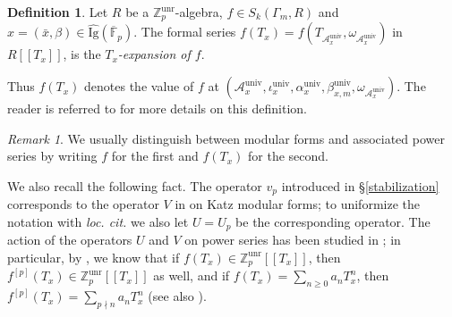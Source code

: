 \documentclass[a4paper,11pt]{amsart}
\numberwithin{equation}{section}
\theoremstyle{plain}
\theoremstyle{definition}
\newtheorem{definition}[theorem]{Definition}
\theoremstyle{remark}
\newtheorem{remark}[theorem]{Remark}
\newcommand{\Z}{\mathbb{Z}}
\newcommand{\F}{\mathbb{F}}
\newcommand{\univ}{\mathrm{univ}}
\newcommand{\unr}{\mathrm{unr}}
\begin{document}
\begin{definition}\label{q-expansion}
Let $R$ be a $\Z_p^\unr$-algebra, $f\in S_k(\Gamma_m,R)$ and $x=(\bar{x},\beta)\in \widehat{\text{Ig}}(\overline{\F}_p)$. The formal series $f(T_x) = f(T_{\mathcal{A}_x^\univ},\omega_{\mathcal{A}_x^\univ})$ in $R[[T_x]]$, is the \emph{$T_x$-expansion of $f$}. \end{definition}
Thus $f(T_x)$ 
denotes the value of $f$ at 
$(\mathcal{A}_x^\univ,\iota_x^\univ,\alpha_x^\univ,\beta_{x,m}^\univ,\omega_{\mathcal{A}_x^\univ})$. The reader is referred to \cite[\S2.2]{Mori1} for more details on this definition. 

\begin{remark}
We usually distinguish between modular forms and associated power series by writing $f$ for the first and $f(T_x)$ for the second. 
\end{remark}

We also recall the following fact. The operator $v_p$ introduced in \S\ref{stabilization} corresponds to the operator $V$ in \cite[\S3.6]{Brooks} on Katz modular forms; to uniformize the notation with \emph{loc. cit.} we also let $U=U_p$ be the corresponding operator. The action of the operators $U$ and $V$ on power series has been studied in \cite[\S4.4]{Brooks}; in particular, by \cite[Proposition 4.17]{Brooks}, we know that if $f(T_x)\in \Z_p^\unr[[T_x]]$, then $f^{[p]}(T_x)\in\Z_p^\unr[[T_x]]$ as well, and if $f(T_{x})= \sum_{n\geq0}a_nT_{x}^n$, then $f^{[p]}(T_{x})=\sum_{p\nmid n}a_nT_{x}^n$ (see also \cite[Lemma 5.2]{Burungale}).
 
\end{document}
